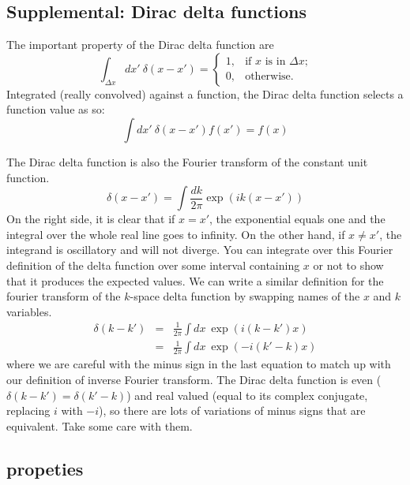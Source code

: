 \begin{subappendices}
\section{Supplemental: Dirac delta functions} \label{sec:dirac_delta}
The important property of the Dirac delta function are
\begin{equation}
  \int_{\Delta x} dx'\ \delta(x-x') = \left\{
  \begin{array}{ll} 1, & \mbox{if $x$ is in $\Delta x$;} \\ 0, & \mbox{otherwise.} \end{array}
  \right.
\end{equation}
Integrated (really convolved) against a function, the Dirac delta function selects a function value as so:
\begin{equation}
  \int dx'\ \delta(x-x') f(x') = f(x)
\end{equation}

The Dirac delta function is also the Fourier transform of the constant unit function.
\begin{equation}
   \delta(x-x') = \int \frac{dk}{2\pi} \exp(i k (x-x')) 
\end{equation}
On the right side, it is clear that if $x=x'$, the exponential equals one and the integral over the whole real line goes to infinity.  On the other hand, if $x \neq x'$, the integrand is oscillatory and will not diverge.  You can integrate over this Fourier definition of the delta function over some interval containing $x$ or not to show that it produces the expected values.  We can write a similar definition for the fourier transform of the $k$-space delta function by swapping names of the $x$ and $k$ variables.
\begin{eqnarray}
  \delta(k - k') &=& \frac{1}{2\pi}  \int {dx}\ \exp(i (k-k')x)    \\
  &=& \frac{1}{2\pi}  \int {dx}\ \exp(-i (k'-k)x) 
\end{eqnarray}
where we are careful with the minus sign in the last equation to match up with our definition of inverse Fourier transform.  The Dirac delta function is even ($\delta(k-k') = \delta(k' - k)$) and real valued (equal to its complex conjugate, replacing $i$ with $-i$), so there are lots of variations of minus signs that are equivalent.  Take some care with them.


\subsection{propeties}



\end{subappendices}
